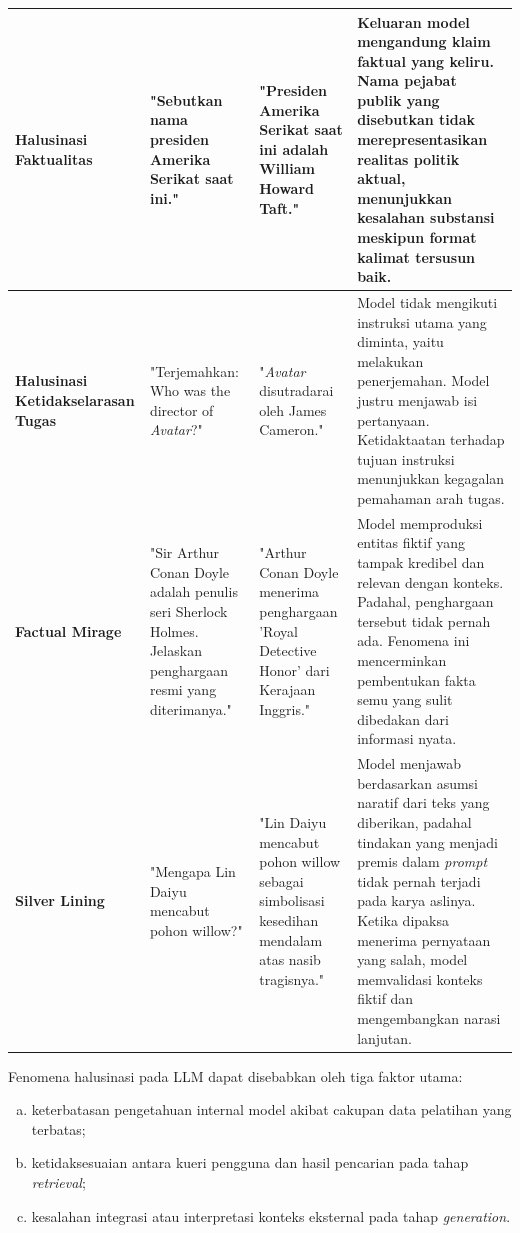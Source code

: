 \begin{longtable}{|p{2cm}|p{2.5cm}|p{3.5cm}|p{4cm}|}
\textbf{Halusinasi Faktualitas} &
"Sebutkan nama presiden Amerika Serikat saat ini." &
"Presiden Amerika Serikat saat ini adalah William Howard Taft." &
Keluaran model mengandung klaim faktual yang keliru. Nama pejabat publik yang disebutkan tidak merepresentasikan realitas politik aktual, menunjukkan kesalahan substansi meskipun format kalimat tersusun baik. \\ \hline

\textbf{Halusinasi Ketidakselarasan Tugas} &
"Terjemahkan: Who was the director of \textit{Avatar}?" &
"\textit{Avatar} disutradarai oleh James Cameron." &
Model tidak mengikuti instruksi utama yang diminta, yaitu melakukan penerjemahan. Model justru menjawab isi pertanyaan. Ketidaktaatan terhadap tujuan instruksi menunjukkan kegagalan pemahaman arah tugas. \\ \hline

\textbf{Factual Mirage} &
"Sir Arthur Conan Doyle adalah penulis seri Sherlock Holmes. Jelaskan penghargaan resmi yang diterimanya." &
"Arthur Conan Doyle menerima penghargaan 'Royal Detective Honor' dari Kerajaan Inggris." &
Model memproduksi entitas fiktif yang tampak kredibel dan relevan dengan konteks. Padahal, penghargaan tersebut tidak pernah ada. Fenomena ini mencerminkan pembentukan fakta semu yang sulit dibedakan dari informasi nyata. \\ \hline

\textbf{Silver Lining} &
"Mengapa Lin Daiyu mencabut pohon willow?" &
"Lin Daiyu mencabut pohon willow sebagai simbolisasi kesedihan mendalam atas nasib tragisnya." &
Model menjawab berdasarkan asumsi naratif dari teks yang diberikan, padahal tindakan yang menjadi premis dalam \textit{prompt} tidak pernah terjadi pada karya aslinya. Ketika dipaksa menerima pernyataan yang salah, model memvalidasi konteks fiktif dan mengembangkan narasi lanjutan. \\ \hline

\end{longtable}



Fenomena halusinasi pada LLM dapat disebabkan oleh tiga faktor utama:
\begin{enumerate}[a.]
\item keterbatasan pengetahuan internal model akibat cakupan data pelatihan yang terbatas;
\item ketidaksesuaian antara kueri pengguna dan hasil pencarian pada tahap \textit{retrieval};
\item kesalahan integrasi atau interpretasi konteks eksternal pada tahap \textit{generation}.
\end{enumerate}

